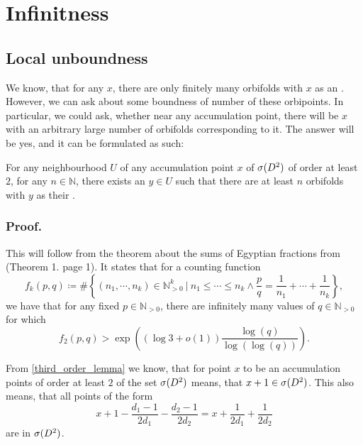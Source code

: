 \section{Infinitness}
\subsection{Local unboundness}
We know, that for any $x$, there are only finitely many orbifolds with $x$ as an \Eoc . 
However, we can ask about some boundness of number of these orbipoints. 
In particular, we could ask, whether near any accumulation point, there will be $x$ with an 
arbitrary large number of orbifolds corresponding to it. 
The answer will be yes, and it can be formulated as such:
\begin{theorem}\label{unboundness}
For any neighbourhood $U$ of any accumulation point $x$ of ${{\sigma}(D^2)}$ of order at least $2$, for any 
$n\in \mathbb{N}$, 
there exists an $y\in U$ such that there are at least $n$ orbifolds with $y$ as their 
\Eoc.
\end{theorem}
\subsubsection{Proof.}
This will follow from the theorem about the sums of Egyptian fractions from \cite{Browning2011} 
(Theorem 1. page 1).
It states that for a counting function
\begin{equation}
f_k(p,q) \coloneqq 
\#\left\{(n_1, \cdots, n_k)\in \mathbb{N}_{>0}^k\ \Big|\ n_1 \leq \cdots \leq n_k 
\land \frac{p}{q} = \frac{1}{n_1} + \cdots + \frac{1}{n_k}\right\},
\end{equation}
we have that for any fixed $p\in\mathbb{N}_{>0}$, there are infinitely many values of 
$q\in\mathbb{N}_{>0}$ for which
\begin{equation}
f_2(p,q) > \exp\left((\log{3}+o(1))\frac{\log(q)}{\log(\log(q))}\right).
\end{equation}

From \ref{third_order_lemma} we know, that for point $x$ to be an accumulation points of order 
at least $2$ of the set ${{\sigma}(D^2)}$ means, that $x + 1 \in {{\sigma}(D^2)}$. This also means, that 
all points of the form 
\begin{equation}\label{pq condition}
x + 1 - \frac{d_1-1}{2d_1} - \frac{d_2-1}{2d_2} = x + \frac{1}{2d_1} + \frac{1}{2d_2}
\end{equation} 
are in ${{\sigma}(D^2)}$. 


